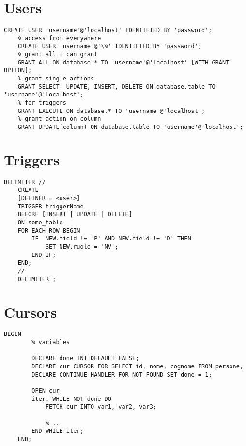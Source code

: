 \documentclass[a4paper]{article}
\author{Paolo Bettelini}
\date{}
\begin{document}
\maketitle
\tableofcontents
\pagebreak

\section{Users}

\begin{lstlisting}[style=sql]
    CREATE USER 'username'@'localhost' IDENTIFIED BY 'password';
    % access from everywhere
    CREATE USER 'username'@'\%' IDENTIFIED BY 'password';
    % grant all + can grant
    GRANT ALL ON database.* TO 'username'@'localhost' [WITH GRANT OPTION];
    % grant single actions
    GRANT SELECT, UPDATE, INSERT, DELETE ON database.table TO 'username'@'localhost';
    % for triggers
    GRANT EXECUTE ON database.* TO 'username'@'localhost';
    % grant action on column
    GRANT UPDATE(column) ON database.table TO 'username'@'localhost';
\end{lstlisting}

\section{Triggers}

\begin{lstlisting}[style=sql]
    DELIMITER //
    CREATE
    [DEFINER = <user>]
    TRIGGER triggerName
    BEFORE [INSERT | UPDATE | DELETE]
    ON some_table
    FOR EACH ROW BEGIN
        IF  NEW.field != 'P' AND NEW.field != 'D' THEN
            SET NEW.ruolo = 'NV';
        END IF;
    END;
    // 
    DELIMITER ;
\end{lstlisting}

\section{Cursors}

\begin{lstlisting}[style=sql]
    BEGIN
        % variables
        
        DECLARE done INT DEFAULT FALSE;
        DECLARE cur CURSOR FOR SELECT id, nome, cognome FROM persone;
        DECLARE CONTINUE HANDLER FOR NOT FOUND SET done = 1;

        OPEN cur;
        iter: WHILE NOT done DO
            FETCH cur INTO var1, var2, var3;

            % ...
        END WHILE iter;
    END;
\end{lstlisting}
\end{document}
